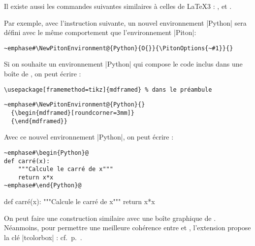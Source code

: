 \documentclass[dvipsnames,svgnames]{article}
\begin{document}
\medskip
Il existe aussi les commandes suivantes similaires à celles de LaTeX3 :
,
 et .



\bigskip
Par exemple, avec l'instruction suivante, un nouvel environnement |{Python}| sera défini
avec le même comportement que l'environnement |{Piton}|:

\begin{Verbatim}
~emphase#\NewPitonEnvironment@{Python}{O{}}{\PitonOptions{~#1}}{}
\end{Verbatim}

\bigskip
Si on souhaite un environnement |{Python}| qui compose le code inclus dans une boîte de
, on peut écrire :

\begin{Verbatim}[formatcom=\footnotesize\color{gray}]
\usepackage[framemethod=tikz]{mdframed} % dans le préambule
\end{Verbatim}

\begin{Verbatim}
~emphase#\NewPitonEnvironment@{Python}{}
  {\begin{mdframed}[roundcorner=3mm]}
  {\end{mdframed}}
\end{Verbatim}

\bigskip
Avec ce nouvel environnement |{Python}|, on peut écrire : 

\begin{Verbatim}
~emphase#\begin{Python}@
def carré(x):
    """Calcule le carré de x"""
    return x*x
~emphase#\end{Python}@
\end{Verbatim}

  {\begin{mdframed}[roundcorner=3mm]}
  {\end{mdframed}}

\begin{Python}
def carré(x):
    """Calcule le carré de x"""
    return x*x
\end{Python}

\bigskip
On peut faire une construction similaire avec une boîte graphique de .
Néanmoins, pour permettre une meilleure cohérence entre  et ,
l'extension  propose la clé |tcolorbox| : cf.~p.~\pageref{tcolorbox}.
\end{document}
